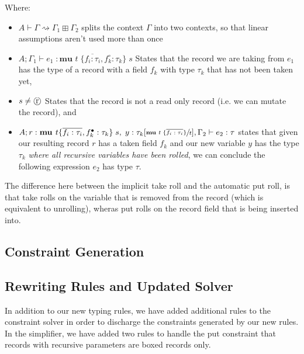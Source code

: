 Where:
\begin{itemize}
    \item $A \vdash \Gamma \rightsquigarrow \Gamma_1 \boxplus \Gamma_2$ splits the context $\Gamma$ into two contexts, so that linear assumptions aren't used 
          more than once
    \item $A;\Gamma_1 \vdash e_1\; : \textbf{mu } t\; \{ \overline{f_i : \tau_i}, f_k^\circ : \tau_k \}\; s$ States that the record we are taking from $e_1$
          has the type of a record with a field $f_k$ with type $\tau_k$ that has not been taken yet,
    \item $s \neq \text{\textcircled{r}}   \vspace{0.5em}$ States that the record is not a read only record (i.e. we can mutate the record), and
    \item $A; r : \textbf{mu } t \{ \overline{f_i : \tau_i}, f_k^\bullet : \tau_k \}\; s
            ,\; y : \tau_k[\sfrac{ \textbf{mu } t\; \{\overline{f_i : \tau_i} \}}{t}], \Gamma_2 \vdash e_2 : \tau$
          states that given our resulting record $r$ has a taken field $f_k$ and our new variable $y$ has the type $\tau_k$ \textit{where all recursive variables have been rolled},
          we can conclude the following expression $e_2$ has type $\tau$.
\end{itemize}

The difference here between the implicit \textsf{take} roll and the automatic \textsf{put} roll, is that \textsf{take} rolls on the variable that is removed from the record
(which is equivalent to unrolling), wheras \textsf{put} rolls on the record field that is being inserted into.


\subsection{Constraint Generation}

\subsection{Rewriting Rules and Updated Solver}

In addition to our new typing rules, we have added additional rules to the constraint
solver in order to discharge the constraints generated by our new rules. In the simplifier,
we have added two rules to handle the \textsf{put} constraint that records with
recursive parameters are boxed records only.


